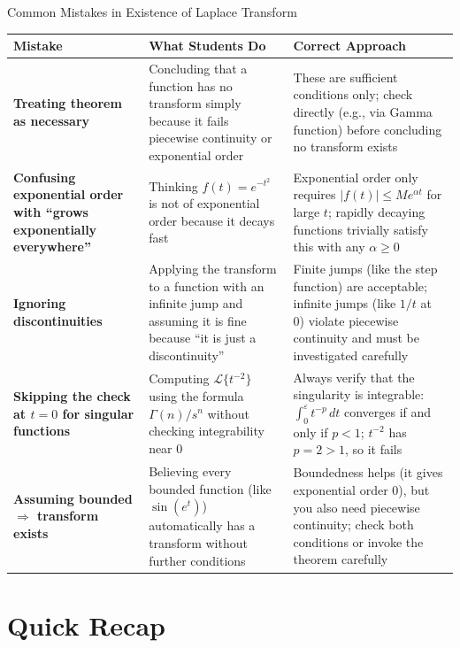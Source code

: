 \documentclass[12pt,a4paper]{article}
\begin{document}
\begin{mistakebox}{Common Mistakes in Existence of Laplace Transform}
\begin{tabular}{>{\bfseries}p{4cm} p{5cm} p{5cm}}
\toprule
Mistake & What Students Do & Correct Approach \\
\midrule
Treating theorem as necessary & Concluding that a function has no transform simply because it fails piecewise continuity or exponential order & These are sufficient conditions only; check directly (e.g., via Gamma function) before concluding no transform exists \\
\midrule
Confusing exponential order with ``grows exponentially everywhere'' & Thinking $f(t) = e^{-t^2}$ is not of exponential order because it decays fast & Exponential order only requires $|f(t)| \leq M e^{\alpha t}$ for large $t$; rapidly decaying functions trivially satisfy this with any $\alpha \geq 0$ \\
\midrule
Ignoring discontinuities & Applying the transform to a function with an infinite jump and assuming it is fine because ``it is just a discontinuity'' & Finite jumps (like the step function) are acceptable; infinite jumps (like $1/t$ at 0) violate piecewise continuity and must be investigated carefully \\
\midrule
Skipping the check at $t=0$ for singular functions & Computing $\mathcal{L}\{t^{-2}\}$ using the formula $\Gamma(n)/s^n$ without checking integrability near 0 & Always verify that the singularity is integrable: $\int_0^\varepsilon t^{-p}\, dt$ converges if and only if $p < 1$; $t^{-2}$ has $p=2>1$, so it fails \\
\midrule
Assuming bounded $\Rightarrow$ transform exists & Believing every bounded function (like $\sin(e^t)$) automatically has a transform without further conditions & Boundedness helps (it gives exponential order 0), but you also need piecewise continuity; check both conditions or invoke the theorem carefully \\
\bottomrule
\end{tabular}
\end{mistakebox}

\section{Quick Recap}
\end{document}
